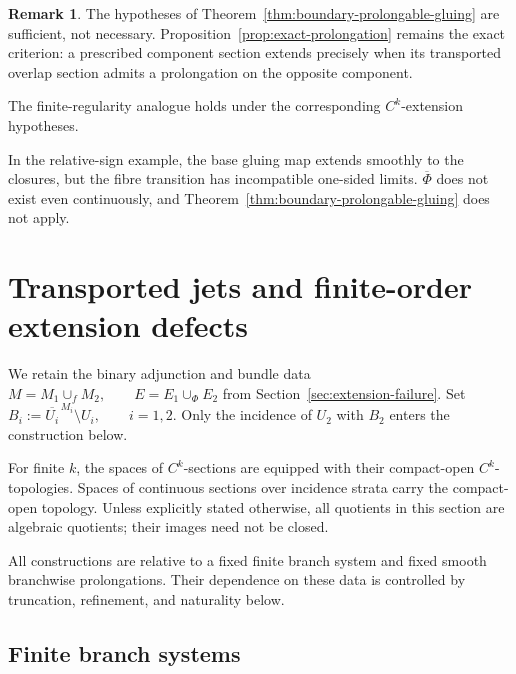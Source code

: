 \documentclass[11pt]{article}
\theoremstyle{plain}
\theoremstyle{definition}
\newtheorem{remark}[theorem]{Remark}
\begin{document}
\begin{remark}
\label{rem:boundary-prolongation-sufficient}
The hypotheses of
Theorem~\ref{thm:boundary-prolongable-gluing}
are sufficient, not necessary. Proposition~\ref{prop:exact-prolongation}
remains the exact criterion: a prescribed component section extends
precisely when its transported overlap section admits a prolongation
on the opposite component.
\end{remark}

The finite-regularity analogue holds under the corresponding \(C^k\)-extension hypotheses.

In the relative-sign example, the base gluing map extends smoothly to
the closures, but the fibre transition has incompatible one-sided
limits. \(\overline\Phi\) does not exist even continuously, and
Theorem~\ref{thm:boundary-prolongable-gluing} does not apply.
\section{Transported jets and finite-order extension defects}
\label{sec:transported-jets}

We retain the binary adjunction and bundle data \(M=M_1\cup_f M_2, \qquad E=E_1\cup_\Phi E_2\) from Section~\ref{sec:extension-failure}. Set
\(B_i := \overline{U_i}^{\,M_i}\setminus U_i, \qquad i=1,2\).
Only the incidence of \(U_2\) with \(B_2\) enters the construction
below.

For finite \(k\), the spaces of \(C^k\)-sections are equipped with
their compact-open \(C^k\)-topologies. Spaces of continuous sections
over incidence strata carry the compact-open topology. Unless
explicitly stated otherwise, all quotients in this section are
algebraic quotients; their images need not be closed.

All constructions are relative to a fixed finite branch system and
fixed smooth branchwise prolongations. Their dependence on these data
is controlled by truncation, refinement, and naturality below.

\subsection{Finite branch systems}
\label{subsec:finite-branch-systems}
\end{document}
